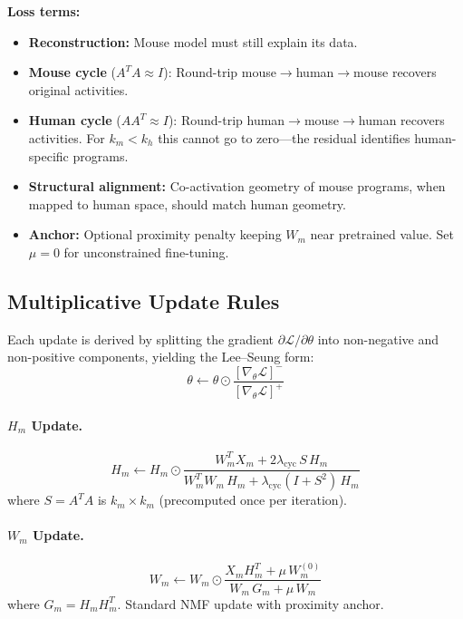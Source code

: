 \documentclass[10pt,twocolumn,letterpaper]{article}
\begin{document}
\textbf{Loss terms:}
\begin{itemize}
  \item \textbf{Reconstruction:} Mouse model must still explain its data.
  \item \textbf{Mouse cycle} ($A^T A \approx I$): Round-trip
        mouse$\to$human$\to$mouse recovers original activities.
  \item \textbf{Human cycle} ($AA^T \approx I$): Round-trip
        human$\to$mouse$\to$human recovers activities. For $k_m < k_h$ this
        cannot go to zero---the residual identifies human-specific programs.
  \item \textbf{Structural alignment:} Co-activation geometry of mouse
        programs, when mapped to human space, should match human geometry.
  \item \textbf{Anchor:} Optional proximity penalty keeping $W_m$ near
        pretrained value. Set $\mu = 0$ for unconstrained fine-tuning.
\end{itemize}

\subsection{Multiplicative Update Rules}

Each update is derived by splitting the gradient $\partial \mathcal{L} / \partial \theta$
into non-negative and non-positive components, yielding the Lee--Seung form:
\begin{equation}
  \theta \leftarrow \theta \odot
    \frac{[\nabla_\theta \mathcal{L}]^-}{[\nabla_\theta \mathcal{L}]^+}
\end{equation}

\paragraph{$H_m$ Update.}
\begin{equation}
  \boxed{H_m \leftarrow H_m \odot
    \frac{W_m^T X_m + 2\lambda_{\text{cyc}}\,S\,H_m}
         {W_m^T W_m\,H_m + \lambda_{\text{cyc}}(I + S^2)\,H_m}}
\end{equation}
where $S = A^T A$ is $k_m \times k_m$ (precomputed once per iteration).

\paragraph{$W_m$ Update.}
\begin{equation}
  \boxed{W_m \leftarrow W_m \odot
    \frac{X_m H_m^T + \mu\,W_m^{(0)}}{W_m\,G_m + \mu\,W_m}}
\end{equation}
where $G_m = H_m H_m^T$. Standard NMF update with proximity anchor.
\end{document}
